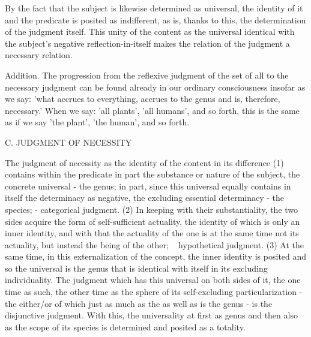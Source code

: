 By the fact that the subject is likewise determined as universal,
the identity of it and the predicate is posited as indifferent,
as is, thanks to this, the determination of the judgment itself.
This unity of the content as the universal identical with
the subject's negative reflection-in-itself makes
the relation of the judgment a necessary relation.

Addition. The progression from the reflexive judgment of the set of all to the
necessary judgment can be found already in our ordinary consciousness insofar as we say:
'what accrues to everything, accrues to the genus and is, therefore, necessary.'
When we say: 'all plants', 'all humans', and so forth, this is the same as
if we say 'the plant', 'the human', and so forth.

C. JUDGMENT OF NECESSITY

The judgment of necessity as the identity of the content in its difference
(1) contains within the predicate in part the substance or nature of the
subject, the concrete universal - the genus; in part, since this universal
equally contains in itself the determinacy as negative, the excluding essential
determinacy - the species; - categorical judgment.
(2) In keeping with their substantiality, the two sides acquire the form
of self-sufficient actuality, the identity of which is only an inner identity,
and with that the actuality of the one is at the same time not its actuality,
but instead the being of the other; ~ hypothetical judgment.
(3) At the same time, in this externalization of the concept, the inner
identity is posited and so the universal is the genus that is identical with
itself in its excluding individuality. The judgment which has this universal
on both sides of it, the one time as such, the other time as the sphere of
its self-excluding particularization - the either/or of which just as much
as the as well as is the genus - is the disjunctive judgment. With this, the
universality at first as genus and then also as the scope of its species is
determined and posited as a totality.

